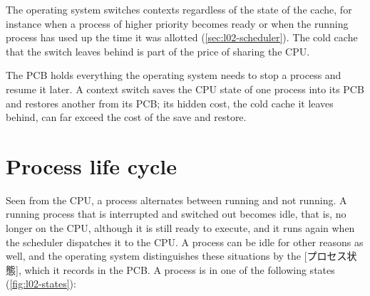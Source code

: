 \documentclass[../main.tex]{subfiles}
\begin{document}
\begin{note}
  The operating system switches contexts regardless of the state of the
  cache, for instance when a process of higher priority becomes ready or
  when the running process has used up the time it was allotted
  (\cref{sec:l02-scheduler}).  The cold cache that the switch leaves behind
  is part of the price of sharing the CPU.
\end{note}

\begin{keypoint}
  The PCB holds everything the operating system needs to stop a process and
  resume it later.  A context switch saves the CPU state of one process into
  its PCB and restores another from its PCB; its hidden cost, the cold cache
  it leaves behind, can far exceed the cost of the save and
  restore.
\end{keypoint}

\section{Process life cycle}
\label{sec:l02-states}

Seen from the CPU, a process alternates between running and not
running.  A running process that is interrupted and switched out becomes
idle, that is, no longer on the CPU, although it is still ready to
execute, and it runs again when the scheduler dispatches it to the
CPU.  A process can be idle for other reasons as well,
and the operating system distinguishes these situations by the
[プロセス状態], which it records in the PCB.  A process
is in one of the following states (\cref{fig:l02-states}):
\end{document}
